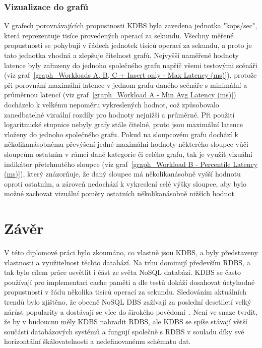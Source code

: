 \documentclass[czech,master,dept460,male,csharp,cpdeclaration]{diploma}
\begin{document}
	\subsection{Vizualizace do grafů}
	
	V grafech porovnávajících propustnosti KDBS byla zavedena jednotka "kops/sec", která reprezentuje tisíce provedených operací za sekundu. Všechny měřené propustnosti se pohybují v řádech jednotek tisíců operací za sekundu, a proto je tato jednotka vhodná a zlepšuje čitelnost grafů. Nejvyšší naměřené hodnoty latence byly zařazeny do jednoho společného grafu napříč všemi testovými scénáři (viz graf~\ref{graph_Workloads A, B, C + Insert only - Max Latency (ms)}), protože při porovnání maximální latence v jednom grafu daného scénáře s minimální a průměrnou latencí (viz graf~\ref{graph_Workload A - Min Avg Latency (ms)}) docházelo k velkému nepoměru vykreslených hodnot, což způsobovalo zanedbatelné vizuální rozdíly pro hodnoty nejnižší a průměrné. Při použití logaritmické stupnice nebyly grafy stále čitelné, proto jsou maximální latence vloženy do jednoho společného grafu. Pokud na sloupcovém grafu dochází k několikanásobnému převýšení jedné maximální hodnoty některého sloupce vůči sloupcům ostatním v rámci dané kategorie či celého grafu, tak je využit vizuální indikátor přetrhnutého sloupce (viz graf~\ref{graph_Workload B - Percentile Latency (ms)}), který znázorňuje, že daný sloupec má několikanásobně vyšší hodnotu oproti ostatním, a zároveň nedochází k vykreslení celé výšky sloupce, aby bylo možné zachovat vizuální poměry ostatních několikanásobně nižších hodnot.
	
	\chapter{Závěr\label{chapter:5-diploma_results}}
	
	V této diplomové práci bylo zkoumáno, co vlastně jsou KDBS, a byly představeny vlastnosti a využitelnost těchto databází. Na trhu dominují především RDBS, a tak bylo cílem práce osvětlit i část ze světa NoSQL databází. KDBS se často používají pro implementaci cache paměti a dle testů dokáží dosahovat úctyhodné propustnosti v řádu několika tisíců operací za sekundu. Sledováním aktuálních trendů bylo zjištěno, že obecně NoSQL DBS zažívají za poslední desetiletí velký nárůst popularity a dostávají se více do širokého povědomí~\cite{dbranking-trend-by-model}. Není ve snaze tvrdit, že by v budoucnu měly KDBS nahradit RDBS, ale KDBS se spíše stávají větší součástí databázových systémů a fungují společně s RDBS v souladu díky své horizontální škálovatelnosti a nedefinovanému schématu dat.
	
\end{document}
